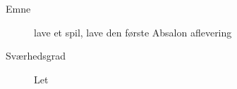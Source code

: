 \begin{description}
\item[Emne] lave et spil, lave den første Absalon aflevering
\item[Sværhedsgrad] Let
\end{description}
